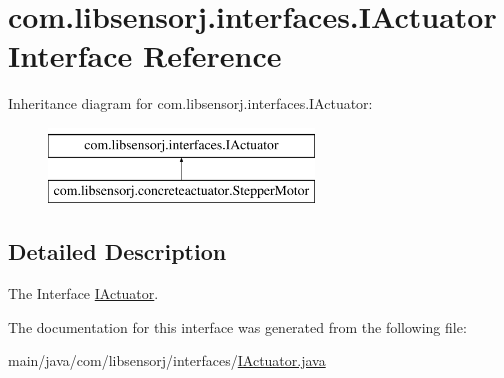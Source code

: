 \hypertarget{interfacecom_1_1libsensorj_1_1interfaces_1_1IActuator}{}\section{com.\+libsensorj.\+interfaces.\+I\+Actuator Interface Reference}
\label{interfacecom_1_1libsensorj_1_1interfaces_1_1IActuator}
Inheritance diagram for com.\+libsensorj.\+interfaces.\+I\+Actuator\+:\begin{figure}[H]
\begin{center}
\leavevmode
\includegraphics[height=2.000000cm]{interfacecom_1_1libsensorj_1_1interfaces_1_1IActuator}
\end{center}
\end{figure}


\subsection{Detailed Description}
The Interface \hyperlink{interfacecom_1_1libsensorj_1_1interfaces_1_1IActuator}{I\+Actuator}. 

The documentation for this interface was generated from the following file\+:\begin{DoxyCompactItemize}
\item 
main/java/com/libsensorj/interfaces/\hyperlink{IActuator_8java}{I\+Actuator.\+java}\end{DoxyCompactItemize}
